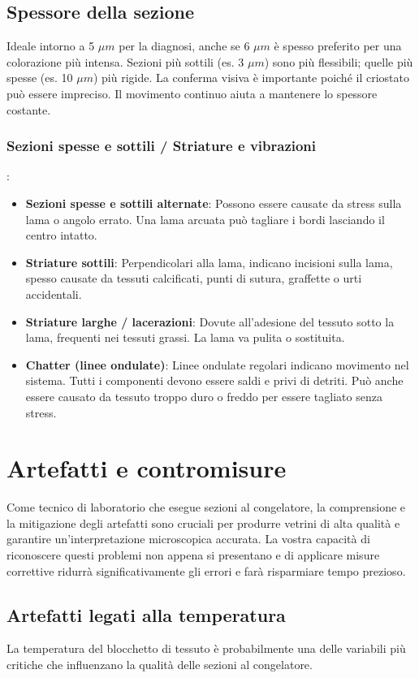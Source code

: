 \subsection{Spessore della sezione}
Ideale intorno a 5 $\mu m$ per la diagnosi, anche se 6 $\mu m$ è spesso preferito per una colorazione più intensa. Sezioni più sottili (es. 3 $\mu m$) sono più flessibili; quelle più spesse (es. 10 $\mu m$) più rigide. La conferma visiva è importante poiché il criostato può essere impreciso. Il movimento continuo aiuta a mantenere lo spessore costante.
\subsubsection{Sezioni spesse e sottili / Striature e vibrazioni}:
\begin{itemize}
\item \textbf{Sezioni spesse e sottili alternate}: Possono essere causate da stress sulla lama o angolo errato. Una lama arcuata può tagliare i bordi lasciando il centro intatto.
\item \textbf{Striature sottili}: Perpendicolari alla lama, indicano incisioni sulla lama, spesso causate da tessuti calcificati, punti di sutura, graffette o urti accidentali.
\item \textbf{Striature larghe / lacerazioni}: Dovute all'adesione del tessuto sotto la lama, frequenti nei tessuti grassi. La lama va pulita o sostituita.
\item \textbf{Chatter (linee ondulate)}: Linee ondulate regolari indicano movimento nel sistema. Tutti i componenti devono essere saldi e privi di detriti. Può anche essere causato da tessuto troppo duro o freddo per essere tagliato senza stress.
\end{itemize}

\section{Artefatti e contromisure}
\label{sec:artefatti}
Come tecnico di laboratorio che esegue sezioni al congelatore, la comprensione e la mitigazione degli artefatti sono cruciali per produrre vetrini di alta qualità e garantire un'interpretazione microscopica accurata.  La vostra capacità di riconoscere questi problemi non appena si presentano e di applicare misure correttive ridurrà significativamente gli errori e farà risparmiare tempo prezioso. 

\subsection{Artefatti legati alla temperatura}
La temperatura del blocchetto di tessuto è probabilmente una delle variabili più critiche che influenzano la qualità delle sezioni al congelatore. 

